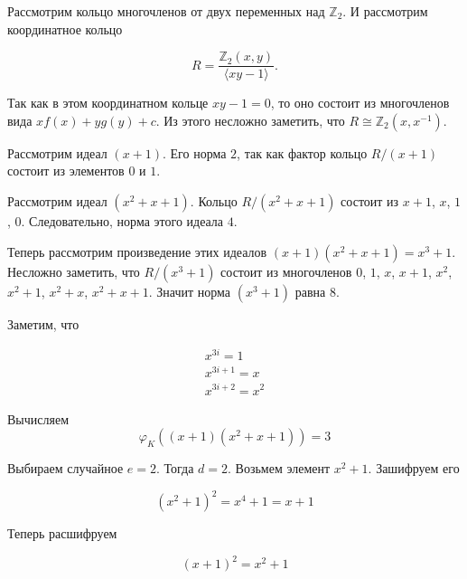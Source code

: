 \documentclass[_00_dissertation.tex]{subfiles}
\begin{document}
\begin{example}
	Рассмотрим кольцо многочленов от двух переменных над $\mathbb{Z}_2$. И рассмотрим координатное кольцо
	
	\begin{equation*}
		R = \frac{\mathbb{Z}_2(x, y)}{\langle xy - 1\rangle}.
	\end{equation*}
	
	Так как в этом координатном кольце $xy - 1 = 0$, то оно состоит из многочленов вида $xf(x) + yg(y) + c$.
	Из этого несложно заметить, что $R\cong \mathbb{Z}_2(x, x^{-1})$.
	
	Рассмотрим идеал $(x+1)$.
	Его норма $2$, так как фактор кольцо $R/(x+1)$ состоит из элементов $0$ и $1$.
	
	Рассмотрим идеал $(x^2 + x + 1)$.
	Кольцо $R/(x^2 + x + 1)$ состоит из $x+1$, $x$, $1$, $0$.
	Следовательно, норма этого идеала $4$.

	Теперь рассмотрим произведение этих идеалов $(x+1)(x^2 + x + 1) = x^3 + 1$.
	Несложно заметить, что $R/(x^3 + 1)$ состоит из многочленов $0$, $1$, $x$, $x+1$, $x^2$, $x^2+1$, $x^2+x$, $x^2+x+1$.
	Значит норма $(x^3 + 1)$ равна $8$.

	Заметим, что
	
	\begin{equation*}
		\begin{array}{l}
			x^{3i} = 1\\
			x^{3i+1} = x\\
			x^{3i+2} = x^2
		\end{array}
	\end{equation*}
	
	Вычисляем
	\begin{equation*}
		\varphi_K((x+1)(x^2 + x + 1)) = 3
	\end{equation*}
	
	Выбираем случайное $e = 2$.
	Тогда $d=2$.
	Возьмем элемент $x^2 + 1$.
	Зашифруем его
	
	\begin{equation*}
		(x^2 + 1)^2 = x^4 + 1 = x + 1
	\end{equation*}
	
	Теперь расшифруем
	
	\begin{equation*}
		(x + 1)^2 = x^2 + 1
	\end{equation*}
\end{example}

\onlyinsubfile{
    
    
}
\end{document}
